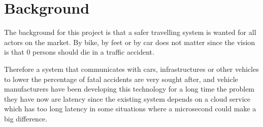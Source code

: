 \section{Background}
The background for this project is that a safer travelling system is wanted for all actors on the market. By bike, by feet or by car does not matter since the vision is that 0 persons should die in a traffic accident.
\bigskip

Therefore a system that communicates with cars, infrastructures or other vehicles to lower the percentage of fatal accidents are very sought after, and vehicle manufacturers have been developing this technology for a long time the problem they have now are latency since the existing system depends on a cloud service which has too long latency in some situations where a microsecond could make a big difference.